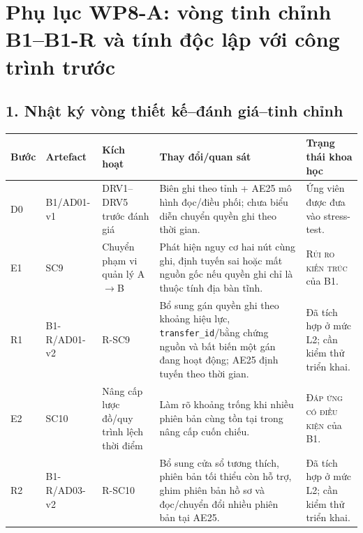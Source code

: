 \documentclass[a4paper,9pt]{article}
\begin{document}
\sloppy\setlength{\emergencystretch}{5em}
\section*{Phụ lục WP8-A: vòng tinh chỉnh B1--B1-R và tính độc lập với công trình trước}

\subsection*{1. Nhật ký vòng thiết kế--đánh giá--tinh chỉnh}
\small
\begin{tabularx}{\textwidth}{@{}p{1.0cm}p{3.6cm}p{4.6cm}X p{4.1cm}@{}}
\toprule
\textbf{Bước} & \textbf{Artefact} & \textbf{Kích hoạt} & \textbf{Thay đổi/quan sát} & \textbf{Trạng thái khoa học}\\
\midrule
D0 & B1/AD01-v1 & DRV1--DRV5 trước đánh giá & Biên ghi theo tỉnh + AE25 mô hình đọc/điều phối; chưa biểu diễn chuyển quyền ghi theo thời gian. & Ứng viên được đưa vào stress-test.\\
\addlinespace
E1 & SC9 & Chuyển phạm vi quản lý A$\rightarrow$B & Phát hiện nguy cơ hai nút cùng ghi, định tuyến sai hoặc mất nguồn gốc nếu quyền ghi chỉ là thuộc tính địa bàn tĩnh. & \textsc{Rủi ro kiến trúc} của B1.\\
\addlinespace
R1 & B1-R/AD01-v2 & R-SC9 & Bổ sung gán quyền ghi theo khoảng hiệu lực, \texttt{transfer\_id}/bằng chứng nguồn và bất biến một gán đang hoạt động; AE25 định tuyến theo thời gian. & Đã tích hợp ở mức L2; cần kiểm thử triển khai.\\
\addlinespace
E2 & SC10 & Nâng cấp lược đồ/quy trình lệch thời điểm & Làm rõ khoảng trống khi nhiều phiên bản cùng tồn tại trong nâng cấp cuốn chiếu. & \textsc{Đáp ứng có điều kiện} của B1.\\
\addlinespace
R2 & B1-R/AD03-v2 & R-SC10 & Bổ sung cửa sổ tương thích, phiên bản tối thiểu còn hỗ trợ, ghim phiên bản hồ sơ và đọc/chuyển đổi nhiều phiên bản tại AE25. & Đã tích hợp ở mức L2; cần kiểm thử triển khai.\\
\bottomrule
\end{tabularx}
\end{document}
